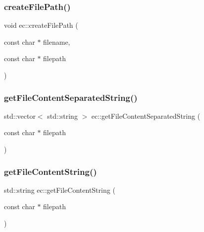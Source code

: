 \mbox{\label{namespaceec_a5a8f3e18381f8cc15c31bd40029458a0}} 
\subsubsection{\texorpdfstring{create\+File\+Path()}{createFilePath()}}
{\footnotesize\ttfamily void ec\+::create\+File\+Path (\begin{DoxyParamCaption}\item[{const char $\ast$}]{filename,  }\item[{const char $\ast$}]{filepath }\end{DoxyParamCaption})}

\mbox{\label{namespaceec_a6f1328d81e3cafdc444b486b212994b8}} 
\subsubsection{\texorpdfstring{get\+File\+Content\+Separated\+String()}{getFileContentSeparatedString()}}
{\footnotesize\ttfamily std\+::vector$<$ std\+::string $>$ ec\+::get\+File\+Content\+Separated\+String (\begin{DoxyParamCaption}\item[{const char $\ast$}]{filepath }\end{DoxyParamCaption})}

\mbox{\label{namespaceec_a8793889e569b903d70fe84e38980ab9c}} 
\subsubsection{\texorpdfstring{get\+File\+Content\+String()}{getFileContentString()}}
{\footnotesize\ttfamily std\+::string ec\+::get\+File\+Content\+String (\begin{DoxyParamCaption}\item[{const char $\ast$}]{filepath }\end{DoxyParamCaption})}

